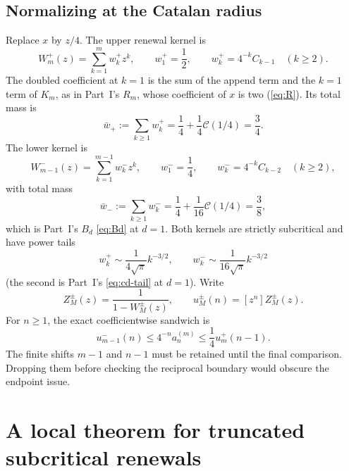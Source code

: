 \documentclass[11pt,a4paper]{article}
\theoremstyle{definition}\newaliascnt{definition}{theorem}
\theoremstyle{remark}\newaliascnt{remark}{theorem}
\newcommand{\Cat}{\mathcal C}
\newcommand{\prcoef}[2]{[#1^{#2}]}
\begin{document}
\subsection{Normalizing at the Catalan radius}
Replace $x$ by $z/4$. The upper renewal kernel is
\begin{equation}
 W_m^+(z)=\sum_{k=1}^m w_k^+z^k,
 \qquad
 w_1^+=\frac12,\qquad
 w_k^+=4^{-k}C_{k-1}\quad(k\ge2).
 \label{pr:eq:weightsplus}
\end{equation}
The doubled coefficient at $k=1$ is the sum of the append term and the $k=1$
term of $K_m$, as in Part~I's $R_m$, whose coefficient of $x$ is two
(\eqref{eq:R}).
Its total mass is
\begin{equation}
 \bar w_+:=\sum_{k\ge1}w_k^+=\frac14+\frac14\Cat(1/4)=\frac34.
 \label{pr:eq:massplus}
\end{equation}
The lower kernel is
\begin{equation}
 W_{m-1}^-(z)=\sum_{k=1}^{m-1}w_k^-z^k,
 \qquad w_1^-=\frac14,\qquad
 w_k^-=4^{-k}C_{k-2}\quad(k\ge2),
 \label{pr:eq:weightsminus}
\end{equation}
with total mass
\begin{equation}
 \bar w_-:=\sum_{k\ge1}w_k^-=\frac14+\frac1{16}\Cat(1/4)=\frac38,
 \label{pr:eq:massminus}
\end{equation}
which is Part~I's $B_d$ \eqref{eq:Bd} at $d=1$. Both kernels are strictly
subcritical and have power tails
\begin{equation}
 w_k^+\sim\frac{1}{4\sqrt\pi}k^{-3/2},\qquad
 w_k^-\sim\frac{1}{16\sqrt\pi}k^{-3/2}
 \label{pr:eq:twotails}
\end{equation}
(the second is Part~I's \eqref{eq:cd-tail} at $d=1$). Write
\[
 Z_M^\pm(z)=\frac1{1-W_M^\pm(z)},\qquad
 u_M^\pm(n)=\prcoef zn Z_M^\pm(z).
\]
For $n\ge1$, the exact coefficientwise sandwich is
\begin{equation}
 u_{m-1}^-(n)\le4^{-n}a_n^{(m)}
 \le\frac14u_m^+(n-1).
 \label{pr:eq:normalizedsandwich}
\end{equation}
The finite shifts $m-1$ and $n-1$ must be retained until the final
comparison. Dropping them before checking the reciprocal boundary would
obscure the endpoint issue.

\section{A local theorem for truncated subcritical renewals}
\label{pr:sec:renewal}
\end{document}
